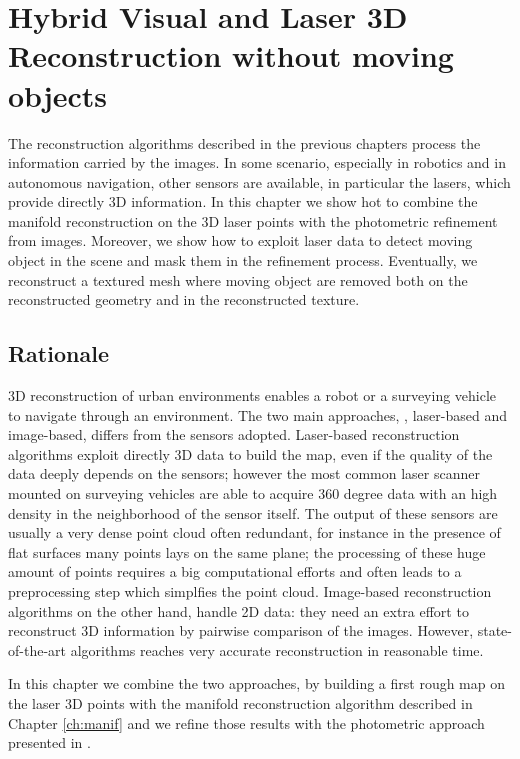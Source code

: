 \chapter[Hybrid Visual and Laser 3D Reconstruction without moving objects]{Hybrid Visual and Laser 3D Reconstruction without moving \\objects}
\label{ch:laser}
The reconstruction algorithms described in the previous chapters process the information carried by the images. 
In some scenario, especially in robotics and in autonomous navigation, other sensors are available, in particular the lasers, which provide directly 3D information.
In this chapter we show hot to combine the manifold reconstruction on the  3D laser points with the photometric refinement from images.
Moreover, we show how to exploit laser data to detect moving object in the scene and mask them in the refinement process. 
Eventually, we reconstruct a textured mesh where moving object are removed both on the reconstructed geometry and in the reconstructed texture.

\minitoc
\newpage
\section{Rationale}
3D reconstruction of urban environments enables a robot or a surveying vehicle to navigate through an environment.
The two main approaches, \ie, laser-based and image-based, differs from the sensors adopted. 
Laser-based reconstruction algorithms exploit directly 3D data to build the map, even if the quality of the data deeply depends on the sensors; however the most common laser scanner mounted on surveying vehicles are able to acquire 360 degree data with an high density in the neighborhood of the sensor itself. 
The output of these sensors are usually a very dense point cloud often redundant, for instance in the presence of flat surfaces many points lays on the same plane; the processing of these huge amount of points requires a big computational efforts and often leads to a preprocessing step which simplfies the point cloud.
Image-based reconstruction algorithms on the other hand, handle 2D data: they need an extra effort to  reconstruct 3D information by pairwise comparison of the images. However, state-of-the-art algorithms \cite{vu_et_al_2012,li2015detail} reaches very accurate reconstruction in reasonable time.

In this chapter we combine the two approaches, by building a first rough map on the laser 3D points with the manifold reconstruction algorithm described in Chapter \ref{ch:manif} and we refine those results with the photometric approach presented in \cite{vu_et_al_2012,li2015detail}.

